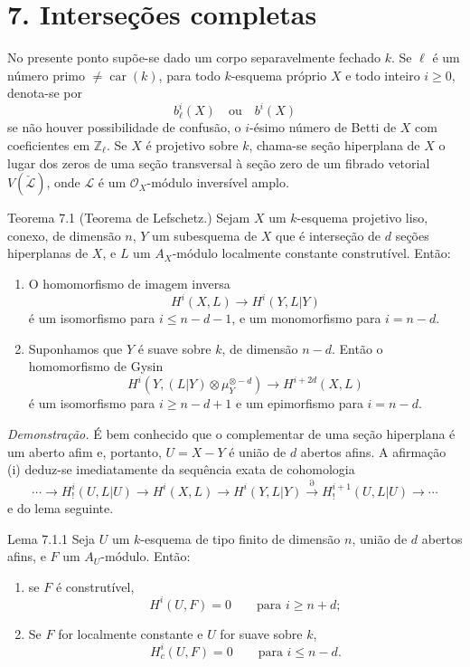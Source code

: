 \section*{7. Interseções completas}

No presente ponto supõe-se dado um corpo separavelmente fechado $k$. Se $\ell$ é um número primo $\ne\operatorname{car}(k)$, para todo $k$-esquema próprio $X$ e todo inteiro $i\ge0$, denota-se por
\[
b_\ell^i(X)\quad\text{ou}\quad b^i(X)
\]
se não houver possibilidade de confusão, o $i$-ésimo número de Betti de $X$ com coeficientes em $\mathbb Z_\ell$. Se $X$ é projetivo sobre $k$, chama-se seção hiperplana de $X$ o lugar dos zeros de uma seção transversal à seção zero de um fibrado vetorial $V(\check{\mathcal L})$, onde $\mathcal L$ é um $\mathcal O_X$-módulo inversível amplo.

\begin{statement}{Teorema 7.1}
(Teorema de Lefschetz.) Sejam $X$ um $k$-esquema projetivo liso, conexo, de dimensão $n$, $Y$ um subesquema de $X$ que é interseção de $d$ seções hiperplanas de $X$, e $L$ um $A_X$-módulo localmente constante construtível. Então:
\begin{enumerate}[label=(\roman*)]
\item O homomorfismo de imagem inversa
\[
H^i(X,L)\to H^i(Y,L|Y)
\]
é um isomorfismo para $i\le n-d-1$, e um monomorfismo para $i=n-d$.
\item Suponhamos que $Y$ é suave sobre $k$, de dimensão $n-d$. Então o homomorfismo de Gysin
\[
H^i(Y,(L|Y)\otimes\mu_Y^{\otimes -d})\to H^{i+2d}(X,L)
\]
é um isomorfismo para $i\ge n-d+1$ e um epimorfismo para $i=n-d$.
\end{enumerate}
\end{statement}

\emph{Demonstração.} É bem conhecido que o complementar de uma seção hiperplana é um aberto afim e, portanto, $U=X-Y$ é união de $d$ abertos afins. A afirmação (i) deduz-se imediatamente da sequência exata de cohomologia
\[
\cdots\to H_!^i(U,L|U)\to H^i(X,L)\to H^i(Y,L|Y)
\xrightarrow{\partial} H_!^{i+1}(U,L|U)\to\cdots
\]
e do lema seguinte.

\begin{statement}{Lema 7.1.1}
Seja $U$ um $k$-esquema de tipo finito de dimensão $n$, união de $d$ abertos afins, e $F$ um $A_U$-módulo. Então:
\begin{enumerate}[label=\alph*)]
\item se $F$ é construtível,
\[
H^i(U,F)=0\qquad\text{para }i\ge n+d;
\]
\item Se $F$ for localmente constante e $U$ for suave sobre $k$,
\[
H^i_c(U,F)=0\qquad\text{para }i\le n-d.
\]
\end{enumerate}
\end{statement}
